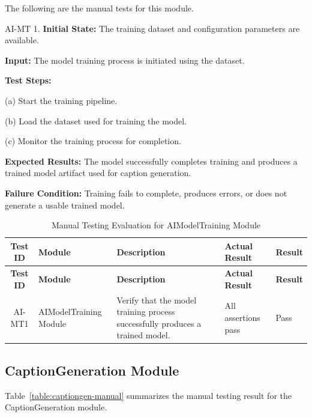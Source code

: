 \documentclass[12pt, titlepage]{article}
\begin{document}
The following are the manual tests for this module.

AI-MT 1. \textbf{Initial State:} The training dataset and
configuration parameters are available.

\textbf{Input:} The model training process is initiated using the dataset.

\textbf{Test Steps:}

(a) Start the training pipeline.

(b) Load the dataset used for training the model.

(c) Monitor the training process for completion.

\textbf{Expected Results:} The model successfully completes training
and produces a trained model artifact used for caption generation.

\textbf{Failure Condition:} Training fails to complete, produces
errors, or does not generate a usable trained model.

\begin{longtable}{@{}c
    >{\raggedright\arraybackslash}p{4.0cm}
    >{\raggedright\arraybackslash}p{4.5cm}
    >{\raggedright\arraybackslash}p{3.6cm}
  >{\centering\arraybackslash}p{1.2cm}@{}}

  \caption{Manual Testing Evaluation for AIModelTraining
  Module}\label{table:ai-training-manual}\\
  \toprule
  \textbf{Test ID} & \textbf{Module} & \textbf{Description} &
  \textbf{Actual Result} & \textbf{Result} \\
  \midrule
  \endfirsthead

  \toprule
  \textbf{Test ID} & \textbf{Module} & \textbf{Description} &
  \textbf{Actual Result} & \textbf{Result} \\
  \midrule
  \endhead

  \bottomrule
  \endlastfoot

  AI-MT1 & AIModelTraining Module &
  Verify that the model training process successfully produces a
  trained model. &
  All assertions pass &
  \cellcolor{green}Pass \\

\end{longtable}

\subsection{CaptionGeneration Module}
Table~\ref{table:captiongen-manual} summarizes the manual testing
result for the CaptionGeneration module.
\end{document}
